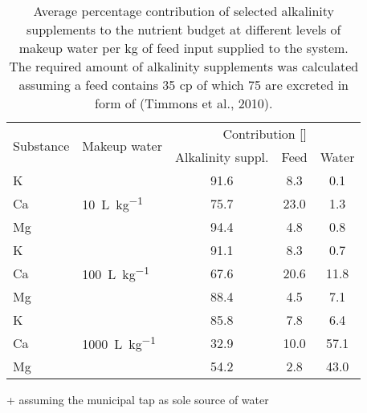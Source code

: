 \begin{table}
\centering
  \begin{threeparttable}
  \caption{Average percentage contribution of selected alkalinity supplements to the nutrient budget at different levels of makeup water per \si{\kg} of feed input supplied to the system. The required amount of alkalinity supplements was calculated assuming a feed contains \SI{35}{\p} \gls{cp} of which \SI{75}{\p} are excreted in form of  (Timmons et al., 2010).}
  \label{tab:alkalinitycont}
    \begin{tabularx}{\textwidth}{XXccc}

    \toprule
  
    \multirow{2}{*}{Substance}
    & \multirow{2}{*}{Makeup water}
    & \multicolumn{3}{c}{Contribution [\si{\p}]}
    \\
    
    \addlinespace
    \cline{3-5}
    \addlinespace
  
    &
    & Alkalinity suppl.
    & Feed
    & Water\tnote{+}
    \\

    \midrule

    K
    & \multirow{3}{*}{\SI{10}{\L\per\kg}}
    & 91.6
    & 8.3
    & 0.1
    \\

    Ca
    &
    & 75.7 
    & 23.0
    & 1.3
    \\

    Mg
    &
    & 94.4
    & 4.8
    & 0.8
    \\

    \addlinespace

    K
    & \multirow{3}{*}{\SI{100}{\L\per\kg}}
    & 91.1
    & 8.3
    & 0.7
    \\

    Ca
    & 
    & 67.6
    & 20.6
    & 11.8
    \\

    Mg
    & 
    & 88.4
    & 4.5
    & 7.1
    \\

    \addlinespace
    
    K
    & \multirow{3}{*}{\SI{1000}{\L\per\kg}}
    & 85.8
    & 7.8
    & 6.4
    \\

    Ca
    &
    & 32.9
    & 10.0
    & 57.1
    \\

    Mg
    &
    & 54.2
    & 2.8
    & 43.0
    \\

  \bottomrule
  \end{tabularx}
    \begin{tablenotes}
      \item[+] assuming the municipal tap as sole source of water
    \end{tablenotes}
  \end{threeparttable}
\end{table}
